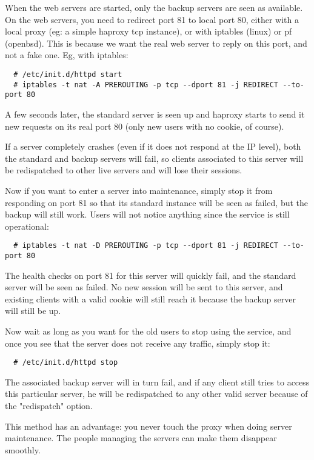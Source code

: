 When the web servers are started, only the backup servers are seen as
available. On the web servers, you need to redirect port 81 to local
port 80, either with a local proxy (eg: a simple haproxy tcp instance),
or with iptables (linux) or pf (openbsd). This is because we want the
real web server to reply on this port, and not a fake one. Eg, with
iptables:

\begin{verbatim}
  # /etc/init.d/httpd start
  # iptables -t nat -A PREROUTING -p tcp --dport 81 -j REDIRECT --to-port 80
\end{verbatim}

A few seconds later, the standard server is seen up and haproxy starts to send
it new requests on its real port 80 (only new users with no cookie, of course).

If a server completely crashes (even if it does not respond at the IP level),
both the standard and backup servers will fail, so clients associated to this
server will be redispatched to other live servers and will lose their sessions.

Now if you want to enter a server into maintenance, simply stop it from
responding on port 81 so that its standard instance will be seen as failed,
but the backup will still work. Users will not notice anything since the
service is still operational:

\begin{verbatim}
  # iptables -t nat -D PREROUTING -p tcp --dport 81 -j REDIRECT --to-port 80
\end{verbatim}

The health checks on port 81 for this server will quickly fail, and the
standard server will be seen as failed. No new session will be sent to this
server, and existing clients with a valid cookie will still reach it because
the backup server will still be up.

Now wait as long as you want for the old users to stop using the service, and
once you see that the server does not receive any traffic, simply stop it:

\begin{verbatim}
  # /etc/init.d/httpd stop
\end{verbatim}

The associated backup server will in turn fail, and if any client still tries
to access this particular server, he will be redispatched to any other valid
server because of the "redispatch" option.

This method has an advantage: you never touch the proxy when doing server
maintenance. The people managing the servers can make them disappear smoothly.

